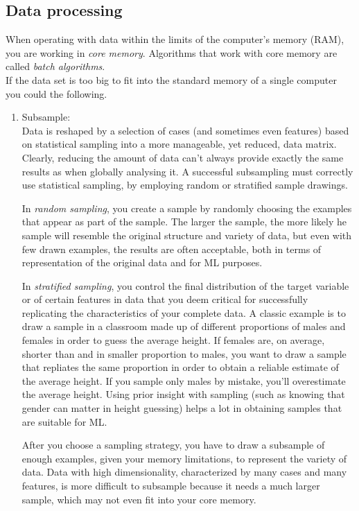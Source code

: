 \subsection{Data processing}
When operating with data within the limits of the computer's memory (RAM), you are working in \emph{core memory}. Algorithms that work with core memory are called \emph{batch algorithms}.\\
If the data set is too big to fit into the standard memory of a single computer you could the following.
\begin{enumerate} 
	\item Subsample: \\
	Data is reshaped by a selection of cases (and sometimes even features) based on statistical sampling into a more manageable, yet reduced, data matrix. Clearly, reducing the amount of data can't always provide exactly the same results as when globally analysing it. A successful subsampling must correctly use statistical sampling, by employing random or stratified sample drawings.
	\begin{definition}
		In \emph{random sampling}, you create a sample by randomly choosing the examples that appear as part of the sample. The larger the sample, the more likely he sample will resemble the original structure and variety of data, but even with few drawn examples, the results are often acceptable, both in terms of representation of the original data and for ML purposes.
	\end{definition}
	\begin{definition}
		In \emph{stratified sampling}, you control the final distribution of the target variable or of certain features in data that you deem critical for successfully replicating the characteristics of your complete data. A classic example is to draw a sample in a classroom made up of different proportions of males and females in order to guess the average height. If females are, on average, shorter than and in smaller proportion to males, you want to draw a sample that repliates the same proportion in order to obtain a reliable estimate of the average height. If you sample only males by mistake, you'll overestimate the average height. Using prior insight with sampling (such as knowing that gender can matter in height guessing) helps a lot in obtaining samples that are suitable for ML.
	\end{definition}
	After you choose a sampling strategy, you have to draw a subsample of enough examples, given your memory limitations, to represent the variety of data. Data with high dimensionality, characterized by many cases and many features, is more difficult to subsample because it needs a much larger sample, which may not even fit into your core memory.

\end{enumerate}
